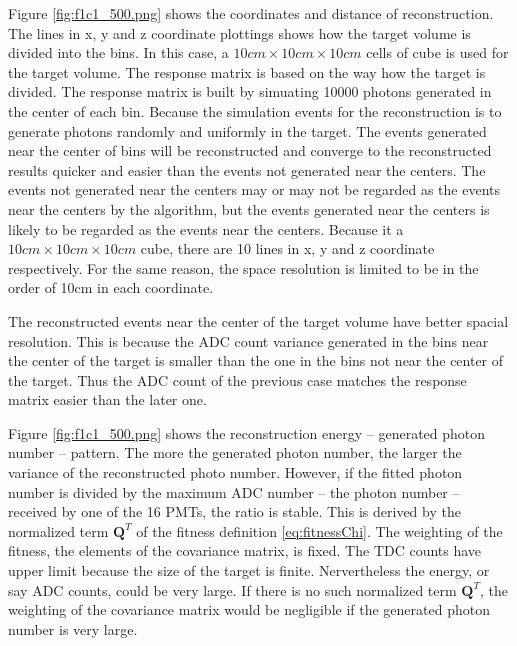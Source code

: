 

Figure \ref{fig:f1c1_500.png} shows the coordinates and distance of reconstruction.
The lines in x, y and z coordinate plottings shows how the target volume is divided into the bins.
In this case, a $10cm\times10cm\times10cm$ cells of cube is used for the target volume. The response matrix
is based on the way how the target is divided. The response matrix is built by simuating 10000 photons
generated in the center of each bin. Because the simulation events for the reconstruction is to generate
photons randomly and uniformly in the target. The events generated near the center of bins will be reconstructed
and converge to the reconstructed results quicker and easier than the events not generated near the centers.
The events not generated near the centers may or may not be regarded as the events near the centers by the algorithm,
but the events generated near the centers is likely to be regarded as the events near the centers.
Because it a $10cm\times10cm\times10cm$ cube, there are 10 lines in x, y and z coordinate respectively.
For the same reason, the space resolution is limited to be in the order of 10cm in each coordinate.

The reconstructed events near the center of the target volume have better spacial resolution.
This is because the ADC count variance generated in the bins near the center of the target is smaller
than the one in the bins not near the center of the target. Thus the ADC count of the previous case
matches the response matrix easier than the later one.

Figure \ref{fig:f1c1_500.png} shows the reconstruction energy -- generated photon number -- pattern.
The more the generated photon number, the larger the variance of the reconstructed photo number.
However, if the fitted photon number is divided by the maximum ADC number -- the photon number -- received by one of the 16 PMTs,
the ratio is stable.
This is derived by the normalized term $\mathbf{Q}^T$ of the fitness definition \ref{eq:fitnessChi}.
The weighting of the fitness, the elements of the covariance matrix, is fixed. The TDC counts have upper limit
because the size of the target is finite. Nervertheless the energy, or say ADC counts, could be very large.
If there is no such normalized term $\mathbf{Q}^T$, the weighting of the covariance matrix would be negligible
if the generated photon number is very large.




